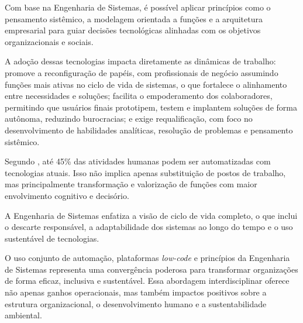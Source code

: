 Com base na Engenharia de Sistemas, é possível aplicar princípios como o pensamento sistêmico, a modelagem 
orientada a funções e a arquitetura empresarial para guiar decisões tecnológicas alinhadas com os objetivos 
organizacionais e sociais.

A adoção dessas tecnologias impacta diretamente as dinâmicas de trabalho: promove a reconfiguração de papéis, 
com profissionais de negócio assumindo funções mais ativas no ciclo de vida de sistemas, o que fortalece o 
alinhamento entre necessidades e soluções; facilita o empoderamento dos colaboradores, permitindo que usuários 
finais prototipem, testem e implantem soluções de forma autônoma, reduzindo burocracias; e exige requalificação, 
com foco no desenvolvimento de habilidades analíticas, resolução de problemas e pensamento sistêmico.

Segundo \cite{mcKinseyAutomation}, até 45\% das atividades humanas podem ser automatizadas com tecnologias atuais.
Isso não implica apenas substituição de postos de trabalho, mas principalmente transformação e valorização de funções
com maior envolvimento cognitivo e decisório.

A Engenharia de Sistemas enfatiza a visão de ciclo de vida completo, o que inclui o descarte responsável, a adaptabilidade
dos sistemas ao longo do tempo e o uso sustentável de tecnologias.

O uso conjunto de automação, plataformas \textit{low-code} e princípios da Engenharia de Sistemas representa uma convergência
poderosa para transformar organizações de forma eficaz, inclusiva e sustentável. Essa abordagem interdisciplinar oferece não apenas ganhos operacionais,
mas também impactos positivos sobre a estrutura organizacional, o desenvolvimento humano e a sustentabilidade ambiental.

